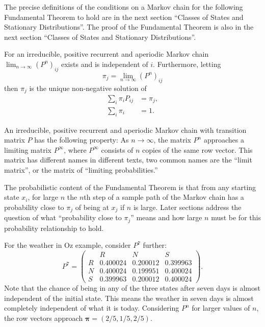 \documentclass[12pt]{article}
\begin{document}
The precise definitions of the conditions on a Markov chain for the
following Fundamental Theorem to hold are in the next section ``Classes
of States and Stationary Distributions''.  The proof of the Fundamental
Theorem is also in the next section ``Classes of States and Stationary
Distributions''.
\begin{theorem}
    For an irreducible, positive recurrent and aperiodic Markov chain \(
    \lim_{n \to \infty} (P^n)_{ij} \) exists and is independent of \( i \).
    Furthermore, letting
    \[
        \pi_j = \lim_{n \to \infty} (P^n)_{ij}
    \] then \( \pi_j \) is the unique non-negative solution of
    \begin{align*}
        \sum\limits_{i} \pi_{i} P_{ij} &= \pi_{j},\\
        \sum\limits_{i} \pi_{i} &= 1.%
    \end{align*}
\end{theorem}

An irreducible, positive recurrent and aperiodic Markov chain with
transition matrix \( P \) has the following property:  As \( n\to\infty \),
the matrix \( P^n \) approaches a limiting matrix \( P^\infty \), where \(
P^\infty \) consists of \( n \) copies of the same row vector.  This
matrix has different names in different texts, two common names are the
``limit matrix'', or the matrix of ``limiting probabilities.''%

The probabilistic content of the Fundamental Theorem is that from any
starting state \( x_i \), for large \( n \) the \( n \)th step of a
sample path of the Markov chain has a probability close to \( \pi_j \)
of being at \( x_j \) if \( n \) is large.  Later sections address the
question of what ``probability close to \( \pi_j \)'' means and how
large \( n \) must be for this probability relationship to hold.

\begin{example}
    For the weather in Oz example, consider \( P^7 \) further:
    \[
        P^7 =
        \begin{pmatrix}
            & R & N & S \\
            R & 0.400024 & 0.200012 & 0.399963 \\
            N & 0.400024 & 0.199951 & 0.400024 \\
            S & 0.399963 & 0.200012 & 0.400024
        \end{pmatrix}
        .
    \] Note that the chance of being in any of the three states after
    seven days is almost independent of the initial state.  This means
    the weather in seven days is almost completely independent of what
    it is today. Considering \( P^n \) for larger values of \( n \), the
    row vectors approach \( \mathbf{\pi}=(2/5,1/5,2/5) \).
\end{example}
\end{document}
